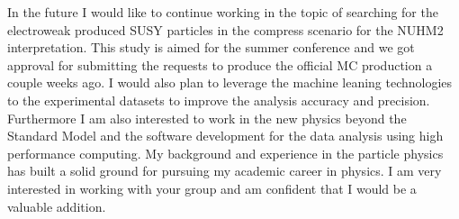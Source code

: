 \documentclass[12pt]{article}
\begin{document}
%

In the future I would like to continue working in the topic of searching for the electroweak produced SUSY particles in the compress scenario for the NUHM2 interpretation.
This study is aimed for the summer conference and we got approval for submitting the requests to produce the official MC production a couple weeks ago.
I would also plan to leverage the machine leaning technologies to the experimental datasets to improve the analysis accuracy and precision.
Furthermore I am also interested to work in the new physics beyond the Standard Model and the software development for the data analysis using high performance computing.
%
My background and experience in the particle physics has built a solid ground for pursuing my academic career in physics.
I am very interested in working with your group and am confident that I would be a valuable addition.

\end{document}
